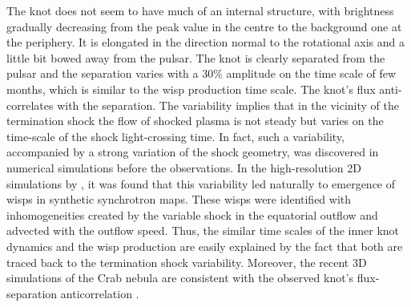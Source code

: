 The knot does not seem to have much of an internal structure, with brightness gradually decreasing from the peak value in the centre to the background one at the periphery. It is elongated in the direction normal to the rotational axis and a little bit bowed away from the pulsar. The knot is clearly separated from the pulsar and the separation varies with  a $30\%$ amplitude on the time scale of few months, which is similar to the wisp production time scale.   The knot’s flux anti-correlates with the separation.      
The variability implies that in the vicinity of the termination shock the flow of shocked plasma is not steady but varies on the time-scale of the shock light-crossing time.  In fact, such a variability, accompanied by a strong variation of the shock geometry, was  discovered in numerical simulations before the observations. In the high-resolution 2D simulations by \citet{camus-09}, it was found that this variability led naturally to emergence of wisps in synthetic synchrotron maps.  These wisps were identified with inhomogeneities created by the variable shock in the  equatorial outflow and advected with the outflow speed.  Thus, the similar time scales of the inner knot dynamics and the wisp production are easily explained by the fact that both are traced back to the termination shock variability.  Moreover, the recent 3D simulations of the Crab nebula are consistent with the observed knot’s flux-separation anticorrelation \citep{porth-14}.    